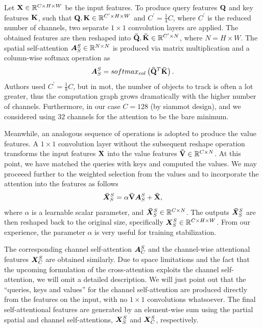 Let $\mathbf{X} \in \mathbb{R}^{{C} \times {H} \times {W}}$ be the input features. To produce query features $\mathbf{Q}$ and key features $\mathbf{K}$, such that $\mathbf{Q}, \mathbf{K} \in \mathbb{R}^{{C^{\prime}} \times {H} \times {W}}$ and $C^{\prime} = \frac{1}{4}C$, where $C^{\prime}$ is the reduced number of channels, two separate $1 \times 1$ convolution layers are applied. The obtained features are then reshaped into $\mathbf{\bar{Q}}, \mathbf{\bar{K}} \in \mathbb{R}^{{C^{\prime}} \times {N}}$, where $N = H \times W$. The spatial self-attention $\bm{A}_{S}^{S} \in \mathbb{R}^{{N} \times {N}}$ is produced via matrix multiplication and a column-wise softmax operation as
\begin{equation}
    \label{eq:SpatialSelfAttention}
    \bm{A}_{S}^{S} =
    {softmax_{col}} \left( \mathbf{\bar{Q}}^T \mathbf{\bar{K}} \right).
\end{equation}
Authors used $C^{\prime} = \frac{1}{8}C$, but in \gls{mot}, the number of objects to track is often a lot greater, thus the computation graph grows dramatically with the higher number of channels. Furthermore, in our case $C = 128$ (by \gls{siammot} design), and we considered using $32$ channels for the attention to be the bare minimum.

Meanwhile, an analogous sequence of operations is adopted to produce the value features. A $1 \times 1$ convolution layer without the subsequent reshape operation transforms the input features $\mathbf{X}$ into the value features $\mathbf{\bar{V}} \in \mathbb{R}^{{C} \times {N}}$. At this point, we have matched the queries with keys and computed the values. We may proceeed further to the weighted selection from the values and to incorporate the attention into the features as follows
\begin{equation}
    \label{eq:SpatialSelfAttentionApplication}
    \bm{\bar{X}}_{S}^{S} =
    \alpha \mathbf{\bar{V}} \bm{A}_{S}^{S} + \mathbf{\bar{X}},
\end{equation}
where $\alpha$ is a learnable scalar parameter, and $\bm{\bar{X}}_{S}^{S} \in \mathbb{R}^{{C} \times {N}}$. The outputs $\bm{\bar{X}}_{S}^{S}$ are then reshaped back to the original size, specifically $\bm{X}_{S}^{S} \in \mathbb{R}^{{C} \times {H} \times {W}}$. From our experience, the parameter $\alpha$ is very useful for training stabilization.

The corresponding channel self-attention $\bm{A}_{C}^{S}$ and the channel-wise attentional features $\bm{X}_{C}^{S}$ are obtained similarly. Due to space limitations and the fact that the upcoming formulation of the cross-attention exploits the channel self-attention, we will omit a detailed description. We will just point out that the ``queries, keys and values'' for the channel self-attention are produced directly from the features on the input, with no $1 \times 1$ convolutions whatsoever. The final self-attentional features are generated by an element-wise sum using the partial spatial and channel self-attentions, $\bm{X}_{S}^{S}$ and $\bm{X}_{C}^{S}$, respectively.

